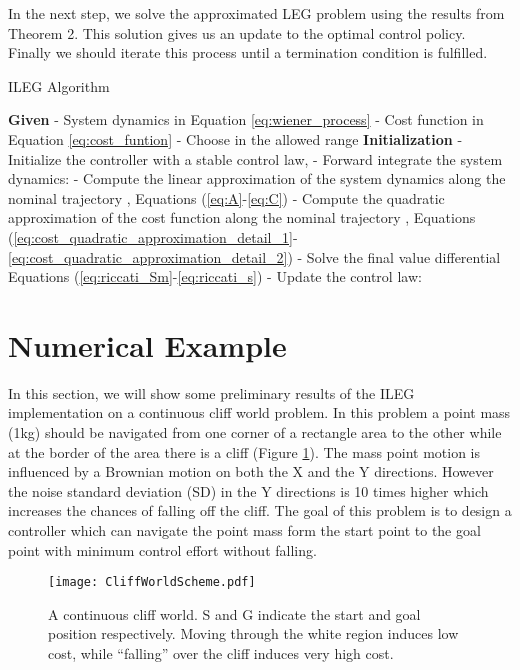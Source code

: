 \documentclass[letterpaper, 10 pt, conference]{ieeeconf}
\begin{document}
In the next step, we solve the approximated LEG problem using the results
from Theorem 2. This solution gives us an update to the optimal control policy.
Finally we should iterate this process until a termination condition is fulfilled.
\begin{algorithm}[tpb]
\caption{ILEG Algorithm}
\label{alg:ileg}
\begin{algorithmic}
\scriptsize 
	\STATE \textbf{Given}
	\STATE - System dynamics in Equation \eqref{eq:wiener_process} 
	\STATE - Cost function in Equation \eqref{eq:cost_funtion}
	\STATE - Choose  in the allowed range
	\STATE \textbf{Initialization}
	\STATE - Initialize the controller with a stable control law, 
	\REPEAT
	\STATE - Forward integrate the system dynamics:
	\STATE 
	\STATE - Compute the linear approximation of the system dynamics along the nominal trajectory , Equations\! (\ref{eq:A}-\ref{eq:C})
	\STATE - Compute the quadratic approximation of the cost function along the nominal trajectory , Equations\! (\ref{eq:cost_quadratic_approximation_detail_1}-\ref{eq:cost_quadratic_approximation_detail_2}) 
	\STATE - Solve the final value differential Equations\! (\ref{eq:riccati_Sm}-\ref{eq:riccati_s})
	\STATE - Update the control law: 
\end{algorithmic}
\end{algorithm} 

\section{Numerical Example}
In this section, we will show some preliminary results of the ILEG
implementation on a continuous cliff world problem. In this problem a point mass
(1kg) should be navigated from one corner of a rectangle area to the other while
at the border of the area there is a cliff (Figure \ref{fig:cliff_world}). The
mass point motion is influenced by a Brownian motion on both the X and the Y
directions. However the noise standard deviation (SD) in the Y directions is 10 times higher which increases the chances of falling off the cliff. The goal of
this problem is to design a controller which can navigate the point mass form the
start point to the goal point with minimum control effort without falling.
\begin{figure} [bpb]
\centering
\texttt{[image: CliffWorldScheme.pdf]}
\caption{A continuous cliff world. S and G indicate the start and goal
  position respectively. Moving through the white region induces low
  cost, while ``falling'' over the cliff induces very high cost.}
\label{fig:cliff_world}
\end{figure}
\end{document}
